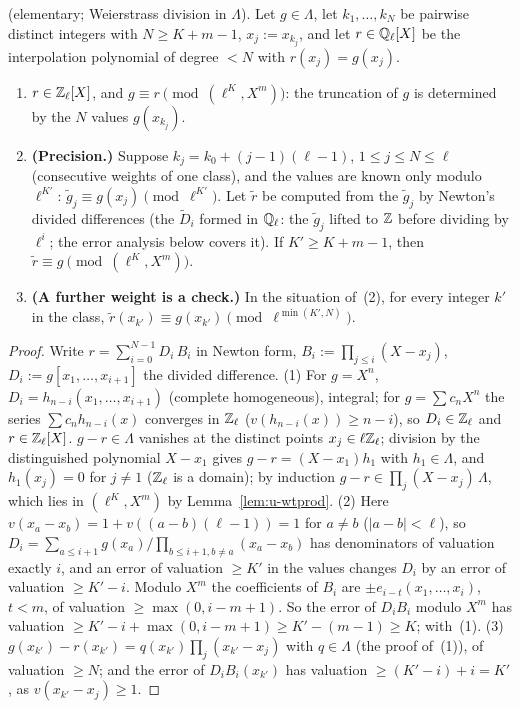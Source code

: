 \documentclass[11pt]{article}
\newcommand{\Iw}{\Lambda}                         %
\newcommand{\Zl}{\Z_\ell}
\begin{document}
\begin{theorem}\label{thm:u-interp}
\PROVED{} (elementary; Weierstrass division in $\Iw$). Let $g\in\Iw$, let $k_1,\dots,k_N$ be pairwise distinct integers with $N\ge K+m-1$, $x_j:=x_{k_j}$, and let
$r\in\mathbb{Q}_\ell[X]$ be the interpolation polynomial of degree $<N$ with $r(x_j)=g(x_j)$.
\begin{enumerate}
\item $r\in\Zl[X]$, and $g\equiv r\pmod{(\ell^{K},X^{m})}$: the truncation of $g$ is determined by the $N$ values $g(x_{k_j})$.
\item \textbf{(Precision.)} Suppose $k_j=k_0+(j-1)(\ell-1)$, $1\le j\le N\le\ell$ (consecutive weights of one class), and the values are known only modulo
  $\ell^{K'}$: $\tilde g_j\equiv g(x_j)\pmod{\ell^{K'}}$. Let $\tilde r$ be computed from the $\tilde g_j$ by Newton's divided differences (the $\tilde D_i$ formed in $\mathbb{Q}_\ell$: the $\tilde g_j$ lifted to $\mathbb{Z}$ before
  dividing by $\ell^{i}$; the error analysis below covers it). If $K'\ge K+m-1$,
  then $\tilde r\equiv g\pmod{(\ell^{K},X^{m})}$.
\item \textbf{(A further weight is a check.)} In the situation of~(2), for every integer $k'$ in the class, $\tilde r(x_{k'})\equiv g(x_{k'})\pmod{\ell^{\min(K',N)}}$.
\end{enumerate}
\end{theorem}

\begin{proof}
Write $r=\sum_{i=0}^{N-1}D_i\,B_i$ in Newton form, $B_i:=\prod_{j\le i}(X-x_j)$, $D_i:=g[x_1,\dots,x_{i+1}]$ the divided difference. (1) For $g=X^{n}$,
$D_i=h_{n-i}(x_1,\dots,x_{i+1})$ (complete homogeneous), integral; for $g=\sum c_nX^{n}$ the series $\sum c_nh_{n-i}(x)$ converges in $\Zl$ ($v(h_{n-i}(x))\ge
n-i$), so $D_i\in\Zl$ and $r\in\Zl[X]$. $g-r\in\Iw$ vanishes at the distinct points $x_j\in\ell\Zl$; division by the distinguished polynomial $X-x_1$ gives
$g-r=(X-x_1)h_1$ with $h_1\in\Iw$, and $h_1(x_j)=0$ for $j\ne1$ ($\Zl$ is a domain); by induction $g-r\in\prod_j(X-x_j)\,\Iw$, which lies in $(\ell^{K},X^{m})$ by
Lemma~\ref{lem:u-wtprod}. (2) Here $v(x_a-x_b)=1+v((a-b)(\ell-1))=1$ for $a\ne b$ ($|a-b|<\ell$), so $D_i=\sum_{a\le i+1}g(x_a)/\prod_{b\le i+1,b\ne a}(x_a-x_b)$
has denominators of valuation exactly $i$, and an error of valuation $\ge K'$ in the values changes $D_i$ by an error of valuation $\ge K'-i$. Modulo $X^{m}$
the coefficients of $B_i$ are $\pm e_{i-t}(x_1,\dots,x_i)$, $t<m$, of valuation $\ge\max(0,i-m+1)$. So the error of $D_iB_i$ modulo $X^{m}$ has valuation
$\ge K'-i+\max(0,i-m+1)\ge K'-(m-1)\ge K$; with~(1). (3) $g(x_{k'})-r(x_{k'})=q(x_{k'})\prod_j(x_{k'}-x_j)$ with $q\in\Iw$ (the proof of~(1)), of valuation $\ge N$;
and the error of $D_iB_i(x_{k'})$ has valuation $\ge(K'-i)+i=K'$, as $v(x_{k'}-x_j)\ge1$.
\end{proof}
\end{document}

